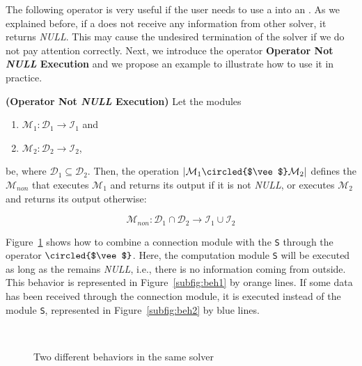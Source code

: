 The following operator is very useful if the user needs to use a \opch{} into an \as{}. As we explained before, if a \opch{} does not receive any information from other solver, it returns {\it NULL}. This may cause the undesired termination of the solver if we do not pay attention correctly. Next, we introduce the operator \textbf{Operator Not {\it NULL} Execution} and we propose an example to illustrate how to use it in practice.

\begin{definition}\label{op:or}
{\bf (Operator Not {\it NULL} Execution)} Let the modules
\begin{enumerate}%
	\item $\mathcal{M}_1 : \mathcal{D}_1 \rightarrow \mathcal{I}_1$ and  
	\item $\mathcal{M}_2 : \mathcal{D}_2 \rightarrow \mathcal{I}_2$,
\end{enumerate}%
be, where $\mathcal{D}_1 \subseteq \mathcal{D}_2$. %
Then, the operation $\left|\mathcal{M}_1\circled{$\vee$}\mathcal{M}_2\right|$ defines the \cm{} $\mathcal{M}_{non}$ that executes $\mathcal{M}_1$ and returns its output if it is not {\it NULL}, or executes $\mathcal{M}_2$ and returns its output otherwise:

\[
\mathcal{M}_{non}:\mathcal{D}_1\cap\mathcal{D}_2 \rightarrow \mathcal{I}_1 \cup \mathcal{I}_2 
\]
\end{definition}

Figure~\ref{fig:2difBeh} shows how to combine a connection module with the \om{} \verb!S! through the operator $\circled{$\vee$}$. Here, the computation module \verb!S! will be executed as long as the \opch{} remains \textit{NULL}, i.e., there is no information coming from outside. This behavior is represented in Figure~\ref{subfig:beh1} by orange lines. If some data has been received through the connection module, it is executed instead of the module \verb!S!, represented in Figure~\ref{subfig:beh2} by blue lines.

\begin{figure}[h]
\centering
{}\\
\caption[]{Two different behaviors in the same solver}
\label{fig:2difBeh}
\end{figure}

